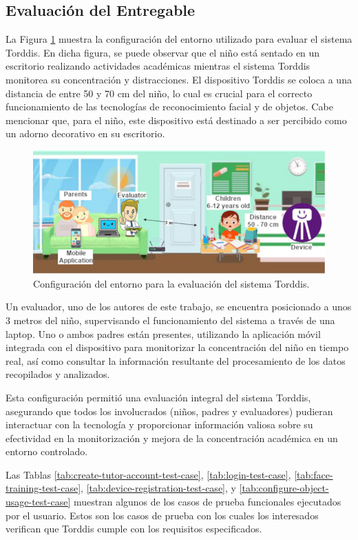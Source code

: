 \documentclass[a4paper,fleqn]{cas-sc}
\begin{document}
	\subsection{Evaluación del Entregable}
	La Figura \ref{fig:ConfigEvaluation} muestra la configuración del entorno utilizado para evaluar el sistema Torddis. En dicha figura, se puede observar que el niño está sentado en un escritorio realizando actividades académicas mientras el sistema Torddis monitorea su concentración y distracciones. El dispositivo Torddis se coloca a una distancia de entre 50 y 70 cm del niño, lo cual es crucial para el correcto funcionamiento de las tecnologías de reconocimiento facial y de objetos. Cabe mencionar que, para el niño, este dispositivo está destinado a ser percibido como un adorno decorativo en su escritorio.
	
	\begin{figure}[hbt!]
		\centering
		\includegraphics[width=\linewidth]{figs/Figure_10}
		\caption{Configuración del entorno para la evaluación del sistema Torddis. \label{fig:ConfigEvaluation}} 
	\end{figure}
	
	Un evaluador, uno de los autores de este trabajo, se encuentra posicionado a unos 3 metros del niño, supervisando el funcionamiento del sistema a través de una laptop. Uno o ambos padres están presentes, utilizando la aplicación móvil integrada con el dispositivo para monitorizar la concentración del niño en tiempo real, así como consultar la información resultante del procesamiento de los datos recopilados y analizados.
	
	Esta configuración permitió una evaluación integral del sistema Torddis, asegurando que todos los involucrados (niños, padres y evaluadores) pudieran interactuar con la tecnología y proporcionar información valiosa sobre su efectividad en la monitorización y mejora de la concentración académica en un entorno controlado.
	
	Las Tablas \ref{tab:create-tutor-account-test-case}, \ref{tab:login-test-case}, \ref{tab:face-training-test-case}, \ref{tab:device-registration-test-case}, y \ref{tab:configure-object-usage-test-case} muestran algunos de los casos de prueba funcionales ejecutados por el usuario. Estos son los casos de prueba con los cuales los interesados verifican que Torddis cumple con los requisitos especificados.
	
\end{document}
